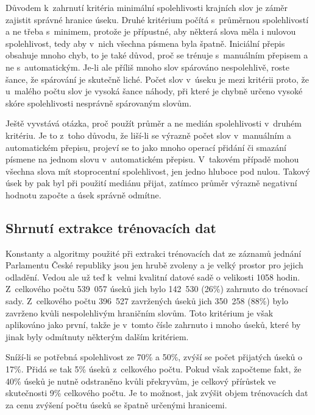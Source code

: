 Důvodem k~zahrnutí kritéria minimální spolehlivosti krajních slov je záměr
zajistit správné hranice úseku. Druhé kritérium počítá s~průměrnou spolehlivostí
a ne třeba s~minimem, protože je přípustné, aby některá slova měla i nulovou
spolehlivost, tedy aby v~nich všechna písmena byla špatně. Iniciální přepis
obsahuje mnoho chyb, to je také důvod, proč se trénuje s~manuálním přepisem a ne
s~automatickým. Je-li ale příliš mnoho slov spárováno nespolehlivě, roste šance,
že spárování je skutečně liché. Počet slov v~úseku je mezi kritérii proto, že
u~malého počtu slov je vysoká šance náhody, při které je chybně určeno vysoké
skóre spolehlivosti nesprávně spárovaným slovům.

Ještě vyvstává otázka, proč použít průměr a ne medián spolehlivosti v~druhém
kritériu. Je to z~toho důvodu, že liší-li se výrazně počet slov v~manuálním a
automatickém přepisu, projeví se to jako mnoho operací přidání či smazání
písmene na jednom slovu v~automatickém přepisu. V~takovém případě
mohou všechna slova mít stoprocentní spolehlivost, jen jedno hluboce pod nulou.
Takový úsek by pak byl při použití mediánu přijat, zatímco průměr výrazně negativní
hodnotu započte a úsek správně odmítne.


\subsection{Shrnutí extrakce trénovacích dat}

Konstanty a algoritmy použité při extrakci trénovacích dat ze záznamů jednání
Parlamentu České republiky jsou jen hrubě zvoleny a je velký prostor pro jejich
odladění. Vedou ale už teď k~velmi kvalitní datové sadě o velikosti 1058 hodin.
Z~celkového počtu 539~057 úseků jich bylo 142~530 (26\%) zahrnuto do trénovací
sady. Z~celkového počtu 396~527 zavržených úseků jich 350~258 (88\%) bylo
zavrženo kvůli nespolehlivým hraničním slovům. Toto kritérium je však aplikováno
jako první, takže je v~tomto čísle zahrnuto i mnoho úseků, které by jinak byly
odmítnuty některým dalším kritériem.

Sníží-li se potřebná spolehlivost ze 70\% a 50\%, zvýší se počet přijatých úseků
o 17\%. Přidá se tak 5\% úseků z~celkového počtu. Pokud však započteme fakt, že
40\% úseků je nutně odstraněno kvůli překryvům, je celkový přírůstek ve
skutečnosti 9\% celkového počtu. Je to možnost, jak zvýšit objem trénovacích dat
za cenu zvýšení počtu úseků se špatně určenými hranicemi.

